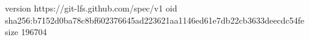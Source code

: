 version https://git-lfs.github.com/spec/v1
oid sha256:b7152d0ba78c8bf602376645ad223621aa1146ed61e7db22cb3633deecdc54fe
size 196704
